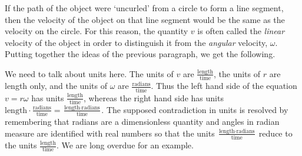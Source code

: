 \documentclass[12pt]{ximera}
\begin{document}
\smallskip

If the path of the object were `uncurled' from a circle to form a line segment, then the velocity of the object on that line segment would be the same as the velocity on the circle.  For this reason, the quantity $v$ is often called the \textit{linear} velocity of the object in order to distinguish it from the \textit{angular} velocity, $\omega$.  Putting together the ideas of the previous paragraph, we get the following.

\smallskip





\smallskip

We need to talk about units here.  The units of $v$ are $\frac{\text{length}}{\text{time}}$, the units of $r$ are length only, and the units of $\omega$ are $\frac{\text{radians}}{\text{time}}$.  Thus the left hand side of the equation $v = r \omega$ has units $\frac{\text{length}}{\text{time}}$, whereas the right hand side has units $\text{length} \cdot \frac{\text{radians}}{\text{time}} = \frac{\text{length} \cdot \text{radians}}{\text{time}} $.  The supposed contradiction in units is resolved by remembering that radians are a dimensionless quantity and angles in radian measure are identified with real numbers so that the units $\frac{\text{length} \cdot \text{radians}}{\text{time}}$ reduce to the units $\frac{\text{length}}{\text{time}}$. We are long overdue for an example.
\end{document}
